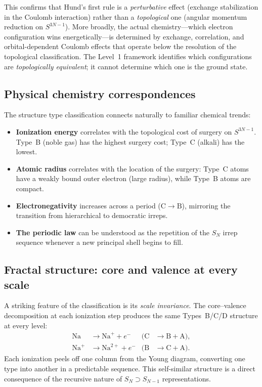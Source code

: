 \documentclass[aps,prl,twocolumn,superscriptaddress,longbibliography]{revtex4-2}
\begin{document}
This confirms that Hund's first rule is a \emph{perturbative} effect
(exchange stabilization in the Coulomb interaction) rather than a
\emph{topological} one (angular momentum reduction on $S^{3N-1}$).
More broadly, the actual chemistry---which electron configuration wins
energetically---is determined by exchange, correlation, and
orbital-dependent Coulomb effects that operate below the resolution of
the topological classification.  The Level~1 framework identifies
which configurations are \emph{topologically equivalent}; it cannot
determine which one is the ground state.

\subsection{Physical chemistry correspondences}

The structure type classification connects naturally to familiar
chemical trends:
\begin{itemize}
  \item \textbf{Ionization energy} correlates with the topological
    cost of surgery on $S^{3N-1}$.  Type~B (noble gas) has the highest
    surgery cost; Type~C (alkali) has the lowest.
  \item \textbf{Atomic radius} correlates with the location of the
    surgery: Type~C atoms have a weakly bound outer electron (large
    radius), while Type~B atoms are compact.
  \item \textbf{Electronegativity} increases across a period
    ($\mathrm{C} \to \mathrm{B}$), mirroring the transition from
    hierarchical to democratic irreps.
  \item \textbf{The periodic law} can be understood as the
    repetition of the $S_N$ irrep sequence whenever a new principal
    shell begins to fill.
\end{itemize}

\subsection{Fractal structure: core and valence at every scale}

A striking feature of the classification is its \emph{scale
invariance}.  The core--valence decomposition at each ionization step
produces the same Types~B/C/D structure at every level:
\begin{align*}
  \text{Na} &\to \text{Na}^+ + e^-
    & (\text{C} &\to \text{B} + \text{A}), \\
  \text{Na}^+ &\to \text{Na}^{2+} + e^-
    & (\text{B} &\to \text{C} + \text{A}).
\end{align*}
Each ionization peels off one column from the Young diagram,
converting one type into another in a predictable sequence.  This
self-similar structure is a direct consequence of the recursive
nature of $S_N \supset S_{N-1}$ representations.
\end{document}
